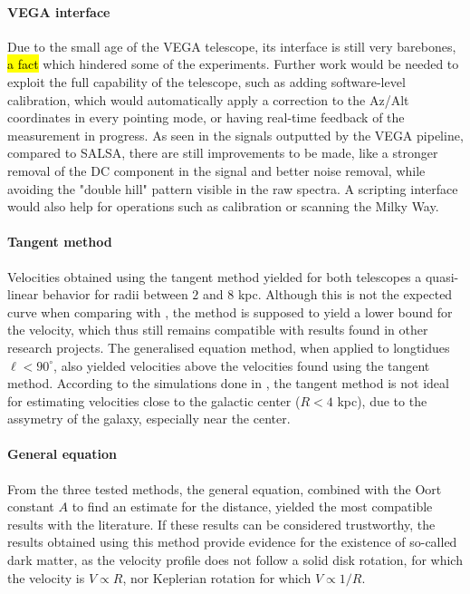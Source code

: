 \paragraph{VEGA interface}
Due to the small age of the VEGA telescope, its interface is still very barebones, \hl{a fact} which hindered some of the experiments. Further work would be needed to exploit the full capability of the telescope, such as adding software-level calibration, which would automatically apply a correction to the Az/Alt coordinates in every pointing mode, or having real-time feedback of the measurement in progress. As seen in the signals outputted by the VEGA pipeline, compared to SALSA, there are still improvements to be made, like a stronger removal of the DC component in the signal and better noise removal, while avoiding the "double hill" pattern visible in the raw spectra. A scripting interface would also help for operations such as calibration or scanning the Milky Way.

\paragraph{Tangent method}
Velocities obtained using the tangent method yielded for both telescopes a quasi-linear behavior for radii between $2$ and $8$ kpc. Although this is not the expected curve when comparing with \cite{mroz_rotation_2019}, the method is supposed to yield a lower bound for the velocity, which thus still remains compatible with results found in other research projects. The generalised equation method, when applied to longtidues $\ell < 90^\circ$, also yielded velocities above the velocities found using the tangent method. According to the simulations done in \cite{chemin_incorrect_2015}, the tangent method is not ideal for estimating velocities close to the galactic center ($R < 4$ kpc), due to the assymetry of the galaxy, especially near the center.

\paragraph{General equation}
From the three tested methods, the general equation, combined with the Oort constant $A$ to find an estimate for the distance, yielded the most compatible results with the literature. If these results can be considered trustworthy, the results obtained using this method provide evidence for the existence of so-called dark matter, as the velocity profile does not follow a solid disk rotation, for which the velocity is $V \propto R$, nor Keplerian rotation for which $V \propto 1/R$.
